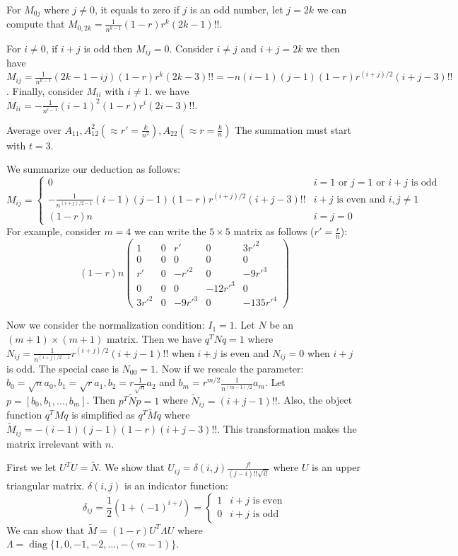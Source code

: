 \documentclass{article}
\DeclareMathOperator*{\diag}{diag}
\begin{document}
For $M_{0j}$ where $j \neq 0$, it equals to zero if $j$ is an odd number, let $j=2k$ we can compute that $M_{0,2k}=\frac{1}{n^{k-1}} (1-r)r^k (2k-1)!! $. 

For $i \neq 0$, if $i+j$ is odd then $M_{ij} = 0$. Consider $i \neq j$ and $i+j = 2k$ we then have $M_{ij} = \frac{1}{n^{k-1}} (2k-1-ij) (1-r)r^k (2k-3)!! = -n(i-1)(j-1) (1-r)r^{(i+j)/ 2 } (i+j-3)!!$. Finally, consider $M_{ii}$ with $i \neq 1$. we have $M_{ii} = 
-\frac{1}{n^{i-1}} (i-1)^2 (1-r)r^i (2i-3)!!$.

Average over $A_{11}, A^2_{12}(\approx r' = \frac{k}{n^2}), A_{22}(\approx r = \frac{k}{n}) $
The summation must start with $t=3$.

We summarize our deduction as follows:
\begin{equation}
M_{ij} = \begin{cases} 0 & i=1 \textrm{ or } j=1 \textrm{ or } i + j \textrm{ is odd} \\
 -\frac{1}{n^{(i+j)/2-1}}(i-1)(j-1) (1-r)r^{(i+j)/ 2 } (i+j-3)!! & i+j \textrm{ is even and } i,j \neq 1 \\
(1-r)n & i=j=0
\end{cases}
\end{equation}
For example, consider $m = 4$ we can write the $ 5 \times 5 $ matrix as follows ($r'=\frac{r}{n}$):
$$
(1-r)n\begin{pmatrix}
1 & 0 & r'  & 0 & 3r'^2\\
0 & 0 & 0  & 0 & 0\\
r' &  0 & - r'^2 & 0 & -9 r'^3 \\
0 & 0 & 0 & -12r'^3 & 0 \\
3r'^2 & 0 & -9 r'^3 & 0 & -135r'^4 
\end{pmatrix}
$$

Now we consider the normalization condition: $I_1 = 1$. Let $N$ be an $(m+1) \times (m+1)$ matrix.
Then we have $q^T N q = 1$ where $N_{ij} =\frac{1}{n^{(i+j)/2-1}}r^{(i+j) / 2} (i+j -1)!!$ when $i+j$ is even and $N_{ij} = 0$ when $i+j$ is odd. The special case is $N_{00} = 1$. Now if we rescale the parameter: $b_0 =  \sqrt{n}a_0, b_1 = \sqrt{r} a_1, b_2 = r \frac{1}{\sqrt{n}}a_2$ and $b_m = r^{m/2} \frac{1}{n^{(m-1)/2}}a_m$. Let $p = [b_0, b_1, \dots, b_m]$. Then $p^T \widetilde{N} p =1$ where $\widetilde{N}_{ij} =  (i+j -1)!!$. Also, the object function $q^T M q$ is simplified as $q^T \widetilde{M} q$ where $\widetilde{M}_{ij} =  -(i-1)(j-1)(1-r) (i+j-3)!! $. This transformation makes the matrix irrelevant with $n$.

First we let $U^T U = \widetilde{N}$. We show that $U_{ij} = \delta(i,j)\frac{j!}{(j-i)!!\sqrt{i!}}$ where $U$ is an upper triangular matrix. $\delta(i,j)$ is an indicator function:
\begin{equation}
\delta_{ij} = \frac{1}{2}(1+(-1)^{i+j})=\begin{cases}
1 & i+j \textrm{ is even} \\
0 & i+j \textrm{ is odd}
\end{cases}
\end{equation}
We can show that $\widetilde{M} = (1-r)U^T \Lambda U$ where $\Lambda = \diag\{1,0, -1, -2, \dots, -(m-1)\}$.
\end{document}
